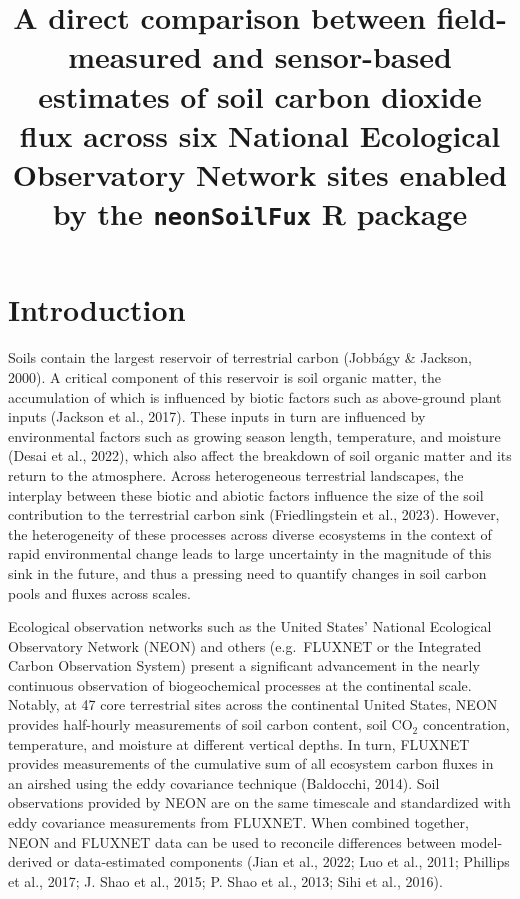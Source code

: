 \documentclass[
  letterpaper,
  DIV=11,
  numbers=noendperiod]{scrartcl}
\title{A direct comparison between field-measured and sensor-based
estimates of soil carbon dioxide flux across six National Ecological
Observatory Network sites enabled by the \texttt{neonSoilFux} R package}
\author{}
\date{}
\begin{document}
\maketitle


\section{Introduction}\label{introduction}

Soils contain the largest reservoir of terrestrial carbon (Jobbágy \&
Jackson, 2000). A critical component of this reservoir is soil organic
matter, the accumulation of which is influenced by biotic factors such
as above-ground plant inputs (Jackson et al., 2017). These inputs in
turn are influenced by environmental factors such as growing season
length, temperature, and moisture (Desai et al., 2022), which also
affect the breakdown of soil organic matter and its return to the
atmosphere. Across heterogeneous terrestrial landscapes, the interplay
between these biotic and abiotic factors influence the size of the soil
contribution to the terrestrial carbon sink (Friedlingstein et al.,
2023). However, the heterogeneity of these processes across diverse
ecosystems in the context of rapid environmental change leads to large
uncertainty in the magnitude of this sink in the future, and thus a
pressing need to quantify changes in soil carbon pools and fluxes across
scales.

Ecological observation networks such as the United States' National
Ecological Observatory Network (NEON) and others (e.g.~FLUXNET or the
Integrated Carbon Observation System) present a significant advancement
in the nearly continuous observation of biogeochemical processes at the
continental scale. Notably, at 47 core terrestrial sites across the
continental United States, NEON provides half-hourly measurements of
soil carbon content, soil CO\(_{2}\) concentration, temperature, and
moisture at different vertical depths. In turn, FLUXNET provides
measurements of the cumulative sum of all ecosystem carbon fluxes in an
airshed using the eddy covariance technique (Baldocchi, 2014). Soil
observations provided by NEON are on the same timescale and standardized
with eddy covariance measurements from FLUXNET. When combined together,
NEON and FLUXNET data can be used to reconcile differences between
model-derived or data-estimated components (Jian et al., 2022; Luo et
al., 2011; Phillips et al., 2017; J. Shao et al., 2015; P. Shao et al.,
2013; Sihi et al., 2016).
\end{document}
